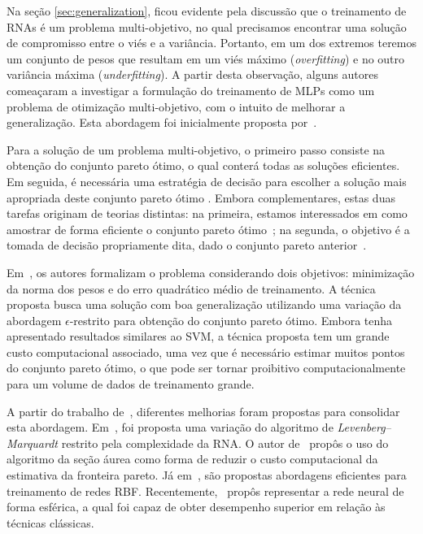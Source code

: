 \documentclass[conference]{IEEEtran}
\begin{document}
	Na seção \ref{sec:generalization}, ficou evidente pela discussão que o treinamento de RNAs é um problema multi-objetivo, no qual precisamos encontrar uma solução de compromisso entre o viés e a variância. Portanto, em um dos extremos teremos um conjunto de pesos que resultam em um viés máximo (\textit{overfitting}) e no outro variância máxima (\textit{underfitting}). A partir desta observação, 
	alguns autores comeaçaram a investigar a formulação do treinamento de MLPs como um problema de otimização multi-objetivo, com o intuito de melhorar a generalização. Esta abordagem foi inicialmente proposta por~\cite{de2000improving}.
	
	Para a solução de um problema multi-objetivo, o primeiro passo consiste na obtenção do conjunto pareto ótimo, o qual conterá todas as soluções eficientes. Em seguida, é necessária uma estratégia de decisão para escolher a solução mais apropriada deste conjunto pareto ótimo \cite{deb2014multi}. Embora complementares, estas duas tarefas originam de teorias distintas: na primeira, estamos interessados em como amostrar de forma eficiente o conjunto pareto ótimo~\cite{collette2004multiobjective}; na segunda, o objetivo é a tomada de decisão propriamente dita, dado o conjunto pareto anterior~\cite{parreiras2005decision}. 
	
	Em~\cite{de2000improving}, os autores formalizam o problema considerando dois objetivos: minimização da norma dos pesos e do erro quadrático médio de treinamento. A técnica proposta busca uma solução com boa generalização utilizando uma variação da abordagem $\epsilon$-restrito para obtenção do conjunto pareto ótimo. Embora tenha apresentado resultados similares ao SVM, a técnica proposta tem um grande custo computacional associado, uma vez que é necessário estimar muitos pontos do conjunto pareto ótimo, o que pode ser tornar proibitivo computacionalmente para um volume de dados de treinamento grande.
	
	A partir do trabalho de~\cite{de2000improving}, diferentes melhorias foram propostas para consolidar esta abordagem. Em~\cite{costa2007improving}, foi proposta uma variação do algoritmo de \textit{Levenberg–Marquardt} restrito pela complexidade da RNA. O autor de~\cite{teixeira2007usage} propôs o uso do algoritmo da seção áurea como forma de reduzir o custo computacional da estimativa da fronteira pareto. Já em~\cite{kokshenev2010efficient, moreira2010lmi}, são propostas abordagens eficientes para treinamento de redes RBF. Recentemente,~\cite{rocha2015training} propôs representar a rede neural de forma esférica, a qual foi capaz de obter desempenho superior em relação às técnicas clássicas.
	
\end{document}
